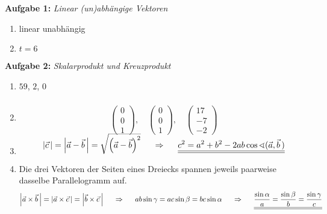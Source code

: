
\textbf{Aufgabe 1: } \emph{Linear (un)abhängige Vektoren}
\begin{enumerate}[label=(\alph*)]
\item linear unabhängig
\item $t=6$
\end{enumerate}
\vspace{0.4cm}
%
\textbf{Aufgabe 2: } \emph{Skalarprodukt und Kreuzprodukt}
\begin{enumerate}[label=(\alph*)]
\item $59$, $2$, $0$
\item \begin{align*} \\[-3.5em]\begin{pmatrix}0\\0\\1\end{pmatrix},\quad\begin{pmatrix}0\\0\\1\end{pmatrix},\quad\begin{pmatrix}17\\-7\\-2\end{pmatrix}\end{align*}
\item \begin{align*} \\[-3.5em]\left|\vec{c}\,\right|=\left|\vec{a}-\vec{b}\,\right|=\sqrt{\left(\vec{a}-\vec{b}\right)^2} \hspace{0.5cm}\Rightarrow\hspace{0.5cm}\underline{\underline{c^2=a^2+b^2-2ab\cos\sphericalangle(\vec{a},\vec{b}\,)}}\end{align*}
\item Die drei Vektoren der Seiten eines Dreiecks spannen jeweils paarweise dasselbe Parallelogramm auf.
\begin{align*}
\left|\vec{a}\times\vec{b}\,\right|=\left|\vec{a}\times\vec{c}\,\right|=\left|\vec{b}\times\vec{c}\,\right| \hspace{0.5cm}\Rightarrow\hspace{0.5cm} ab\sin\gamma=ac\sin\beta=bc\sin\alpha \hspace{0.5cm}\Rightarrow\hspace{0.5cm}\underline{\underline{\frac{\sin\alpha}{a}=\frac{\sin\beta}{b}=\frac{\sin\gamma}{c}}}
\end{align*}
\end{enumerate}
